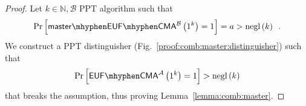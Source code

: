     \begin{proof}
      Let $k \in \mathbb{N}, \mathcal{B}$ PPT algorithm such that
      \begin{equation*}
        \Pr\left[\mathsf{master \mhyphen EUF \mhyphen
        CMA}^{\mathcal{B}}\left(1^k\right) = 1\right] = a >
        \mathrm{negl}\left(k\right) \enspace.
      \end{equation*}
      We construct a PPT distinguisher \adversary{}
      (Fig.~\ref{proof:comb:master:distinguisher}) such that
      \begin{equation*}
        \Pr\left[\mathsf{EUF \mhyphen CMA}^{\adversary}\left(1^k\right) =
        1\right] > \mathrm{negl}\left(k\right)
      \end{equation*}
      that breaks the assumption, thus proving Lemma~\ref{lemma:comb:master}.


\end{proof}
